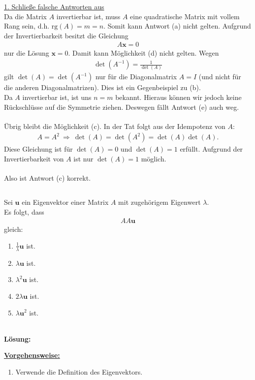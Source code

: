 \underline{1. Schließe falsche Antworten aus}\\
Da die Matrix $A$ invertierbar ist, muss $A$ eine quadratische Matrix mit vollem Rang sein, d.h. $\mathrm{rg}(A) = m= n$. Somit kann Antwort (a) nicht gelten.
Aufgrund der Invertierbarkeit besitzt die Gleichung
\begin{align*}
	A \mathbf{x} = 0
\end{align*} 
nur die Lösung $\mathbf{x} = 0$. Damit kann Möglichkeit (d) nicht gelten.
Wegen 
\begin{align*}
	\det(A^{-1}) = \frac{1}{\det(A)}
\end{align*}
gilt $\det(A) = \det(A^{-1})$ nur für die Diagonalmatrix $A = I$ (und nicht für die anderen Diagonalmatrizen). Dies ist ein Gegenbeispiel zu (b).\\
Da $A$ invertierbar ist, ist uns $n = m$ bekannt. Hieraus können wir jedoch keine Rückschlüsse auf die Symmetrie ziehen. Deswegen fällt Antwort (e) auch weg.\\
\\
Übrig bleibt die Möglichkeit (c). In der Tat folgt aus der Idempotenz von $A$:
\begin{align*}
	A = A^2 
	\ \Rightarrow \
	\det(A) = \det(A^2) = \det(A) \det(A).
\end{align*}
Diese Gleichung ist für $\det(A) = 0$ und $\det(A) = 1$ erfüllt.
Aufgrund der Invertierbarkeit von $A$ ist nur $\det(A) = 1$ möglich. \\
\\
Also ist Antwort (c) korrekt.




\newpage

\subsection*{}
Sei $\mathbf{u} $ ein Eigenvektor einer Matrix $A$ mit zugehörigem Eigenwert $\lambda$.
\\
Es folgt, dass 
\begin{align*}
	AA \mathbf{u}
\end{align*}
gleich:
\renewcommand{\labelenumi}{(\alph{enumi})}
\begin{enumerate}
	\item 
	$ \frac{1}{\lambda} \mathbf{u} $ ist.
	\item 
	$ \lambda \mathbf{u} $ ist.
	\item
	$ \lambda^2 \mathbf{u}$ ist.
	\item
	$ 2\lambda \mathbf{u} $ ist.
	\item 
	$ \lambda \mathbf{u}^2 $ ist.
\end{enumerate}
\ \\
\textbf{Lösung:}
\begin{mdframed}
\underline{\textbf{Vorgehensweise:}}
\renewcommand{\labelenumi}{\theenumi.}
\begin{enumerate}
\item Verwende die Definition des Eigenvektors.
\end{enumerate}
\end{mdframed}

